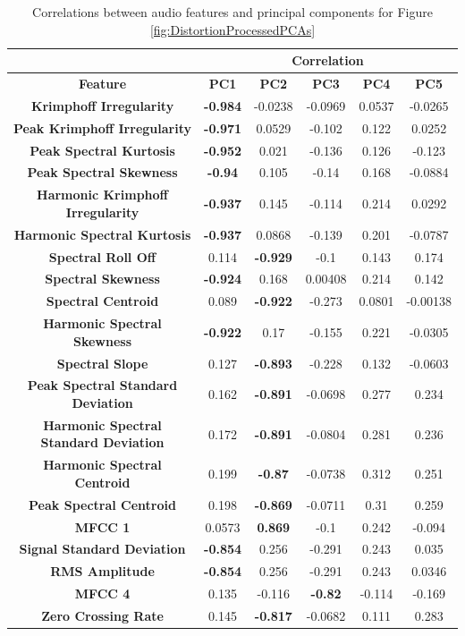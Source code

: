 		\begin{table}[h!]
			\centering
			\begin{tabular}{|c|c|c|c|c|c|}
				\cline{2-6}
				\multicolumn{1}{c|}{} & \multicolumn{5}{c|}{\bf{Correlation}} \tabularnewline
				\hline
				\bf{Feature} & \bf{PC1} & \bf{PC2} & \bf{PC3} & \bf{PC4} & \bf{PC5} \tabularnewline
				\hline
				\hline
				\bf{Krimphoff Irregularity} & \bf{-0.984} & -0.0238 & -0.0969 & 0.0537 & -0.0265 \tabularnewline
				\hline
				\bf{Peak Krimphoff Irregularity} & \bf{-0.971} & 0.0529 & -0.102 & 0.122 & 0.0252 \tabularnewline
				\hline
				\bf{Peak Spectral Kurtosis} & \bf{-0.952} & 0.021 & -0.136 & 0.126 & -0.123 \tabularnewline
				\hline
				\bf{Peak Spectral Skewness} & \bf{-0.94} & 0.105 & -0.14 & 0.168 & -0.0884 \tabularnewline
				\hline
				\bf{Harmonic Krimphoff Irregularity} & \bf{-0.937} & 0.145 & -0.114 & 0.214 & 0.0292 \tabularnewline
				\hline
				\bf{Harmonic Spectral Kurtosis} & \bf{-0.937} & 0.0868 & -0.139 & 0.201 & -0.0787 \tabularnewline
				\hline
				\bf{Spectral Roll Off} & 0.114 & \bf{-0.929} & -0.1 & 0.143 & 0.174 \tabularnewline
				\hline
				\bf{Spectral Skewness} & \bf{-0.924} & 0.168 & 0.00408 & 0.214 & 0.142 \tabularnewline
				\hline
				\bf{Spectral Centroid} & 0.089 & \bf{-0.922} & -0.273 & 0.0801 & -0.00138 \tabularnewline
				\hline
				\bf{Harmonic Spectral Skewness} & \bf{-0.922} & 0.17 & -0.155 & 0.221 & -0.0305 \tabularnewline
				\hline
				\bf{Spectral Slope} & 0.127 & \bf{-0.893} & -0.228 & 0.132 & -0.0603 \tabularnewline
				\hline
				\bf{Peak Spectral Standard Deviation} & 0.162 & \bf{-0.891} & -0.0698 & 0.277 & 0.234 \tabularnewline
				\hline
				\bf{Harmonic Spectral Standard Deviation} & 0.172 & \bf{-0.891} & -0.0804 & 0.281 & 0.236 \tabularnewline
				\hline
				\bf{Harmonic Spectral Centroid} & 0.199 & \bf{-0.87} & -0.0738 & 0.312 & 0.251 \tabularnewline
				\hline
				\bf{Peak Spectral Centroid} & 0.198 & \bf{-0.869} & -0.0711 & 0.31 & 0.259 \tabularnewline
				\hline
				\bf{MFCC 1} & 0.0573 & \bf{0.869} & -0.1 & 0.242 & -0.094 \tabularnewline
				\hline
				\bf{Signal Standard Deviation} & \bf{-0.854} & 0.256 & -0.291 & 0.243 & 0.035 \tabularnewline
				\hline
				\bf{RMS Amplitude} & \bf{-0.854} & 0.256 & -0.291 & 0.243 & 0.0346 \tabularnewline
				\hline
				\bf{MFCC 4} & 0.135 & -0.116 & \bf{-0.82} & -0.114 & -0.169 \tabularnewline
				\hline
				\bf{Zero Crossing Rate} & 0.145 & \bf{-0.817} & -0.0682 & 0.111 & 0.283 \tabularnewline
				\hline
			\end{tabular}
			\caption{Correlations between audio features and principal components for Figure
				 \ref{fig:DistortionProcessedPCAs}}
			\label{fig:DistortionProcessedCorrelations}
		\end{table}

